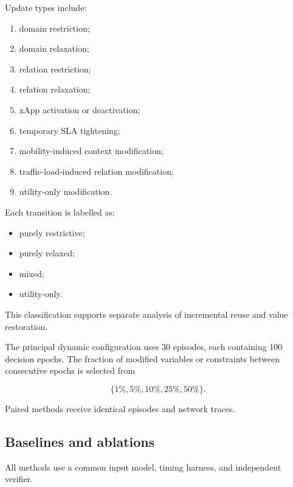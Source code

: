 \documentclass[pdflatex,sn-mathphys-num,iicol,oneside]{sn-jnl}
\begin{document}
Update types include:

\begin{enumerate}
    \item domain restriction;
    \item domain relaxation;
    \item relation restriction;
    \item relation relaxation;
    \item xApp activation or deactivation;
    \item temporary SLA tightening;
    \item mobility-induced context modification;
    \item traffic-load-induced relation modification;
    \item utility-only modification.
\end{enumerate}

Each transition is labelled as:

\begin{itemize}
    \item purely restrictive;
    \item purely relaxed;
    \item mixed;
    \item utility-only.
\end{itemize}

This classification supports separate analysis of incremental reuse
and value restoration.

The principal dynamic configuration uses
30 episodes, each containing 100 decision epochs.
The fraction of modified variables or constraints between consecutive
epochs is selected from

\begin{equation}
\{1\%,5\%,10\%,25\%,50\%\}.
\end{equation}

Paired methods receive identical episodes and network traces.

\subsection{Baselines and ablations}

All methods use a common input model, timing harness, and independent
verifier.
\end{document}

